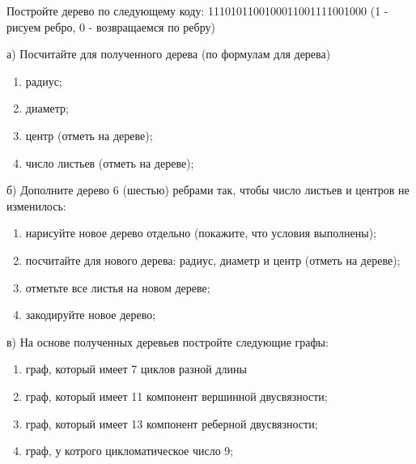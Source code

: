 \question 
Постройте дерево по следующему коду: 1110101100100011001111001000 (1 - рисуем ребро, 0 - возвращаемся по ребру)

а) Посчитайте для полученного дерева (по формулам для дерева)
\begin{enumerate}
\item радиус;
\item диаметр;
\item центр (отметь на дереве);
\item число листьев (отметь на дереве);
\end{enumerate}

б) Дополните дерево 6 (шестью) ребрами так, чтобы число листьев и центров не изменилось:
\begin{enumerate}
\item нарисуйте новое дерево отдельно (покажите, что условия выполнены);
\item посчитайте для нового дерева: радиус, диаметр и центр (отметь на дереве);
\item отметьте все листья на  новом дереве;
\item закодируйте новое дерево;
\end{enumerate}

в) На основе полученных деревьев  постройте следующие графы:
\begin{enumerate}
\item граф, который имеет 7 циклов разной длины
\item граф, который имеет 11 компонент вершинной двусвязности;
\item граф, который имеет 13 компонент реберной двусвязности;
\item граф, у котрого цикломатическое число 9;
\end{enumerate}
